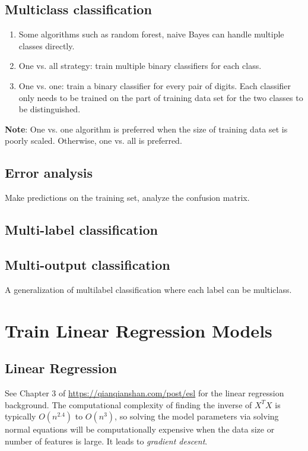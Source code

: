 \documentclass[12pt,oneside,a4paper]{article}
\numberwithin{equation}{section}
\begin{document}
\subsection{Multiclass classification}
\begin{enumerate}
\item Some algorithms such as random forest, naive Bayes can handle multiple classes directly. 
\item One vs. all strategy: train multiple binary classifiers for each class. 

\item One vs. one: train a binary classifier for every pair of digits. Each classifier only needs to be trained on the part of training data set for the two classes to be distinguished.
\end{enumerate}

\textbf{Note}: One vs. one algorithm is preferred when the size of training data set is poorly scaled.  Otherwise, one vs. all is preferred. 
\subsection{Error analysis}

Make predictions on the training set, analyze the confusion matrix. 
\subsection{Multi-label classification}

\subsection{Multi-output classification}
A generalization of multilabel classification where each label can be multiclass. 

\section{Train Linear Regression Models}
\subsection{Linear Regression}
See Chapter 3 of \href{https://qianqianshan.com/post/elementsofstatisticallearning/}{https://qianqianshan.com/post/esl} for the linear regression background. The computational complexity of finding the inverse of $X^TX$ is typically $O(n^{2.4})$ to $O(n^3)$, so solving the model parameters via solving normal equations will be computationally expensive when the data size or number of features is large. It leads to \emph{gradient descent}.
\end{document}

